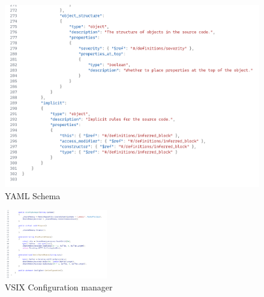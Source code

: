 \begin{figure}
{\begin{minipage}[t]{0.6\linewidth}
    \end{minipage}
    \begin{minipage}[t]{0.65\linewidth}
        \vspace{-75px}
        \centering
        \caption{YAML Schema}
        \label{fig:YAMLSchema}
        \includegraphics[width=\linewidth, height=\textheight, keepaspectratio]{Figures/YAMLSchemaCropped.png}
    \end{minipage}
}
\end{figure}



\begin{figure}
    \centering
    \caption{VSIX Configuration manager}
    \label{fig:VSIXConfigurationManager}
    \includegraphics[width=0.4\textwidth]{Figures/VSIXAConfigManagerCropped.png}
\end{figure}

